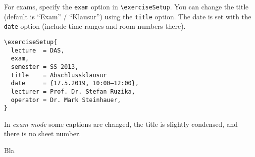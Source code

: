 \documentclass[german]{mhexsheet}
\begin{document}
\maketitle
For exams, specify the \verb|exam| option in \verb|\exerciseSetup|. You can change the title (default is \enquote{Exam} / \enquote{Klausur}) using the \verb|title| option. The date is set with the \verb|date| option (include time ranges and room numbers there).
\begin{verbatim}
\exerciseSetup{
  lecture  = DAS,    
  exam,              
  semester = SS 2013,
  title    = Abschlussklausur
  date     = {17.5.2019, 10:00–12:00},
  lecturer = Prof. Dr. Stefan Ruzika,
  operator = Dr. Mark Steinhauer,
}
\end{verbatim}
In \emph{exam mode} some captions are changed, the title is slightly condensed, and there is no sheet number.
\begin{exercise}[points=10]
Bla
\end{exercise}

\begin{solution}[points=3+3+4]


\end{solution}

\begin{exercise}
\end{exercise}
\end{document}
